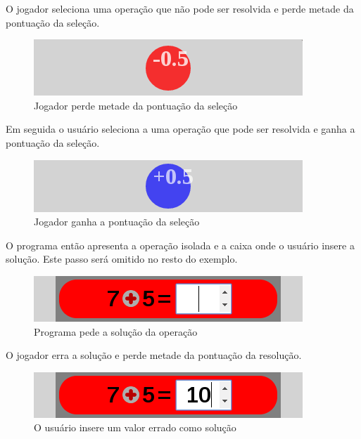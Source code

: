O jogador seleciona uma operação que não pode ser resolvida e perde metade da pontuação da seleção.

\begin{figure}[H]
	\caption{\label{miss_0_5_1}Jogador perde metade da pontuação da seleção}
	\begin{center}
	    \includegraphics[scale=1]{miss_0_5.png}
	\end{center}
\end{figure}

Em seguida o usuário seleciona a uma operação que pode ser resolvida e ganha a pontuação da seleção.

\begin{figure}[H]
	\caption{\label{score_0_5_1}Jogador ganha a pontuação da seleção}
	\begin{center}
	    \includegraphics[scale=1]{score_0_5.png}
	\end{center}
\end{figure}

O programa então apresenta a operação isolada e a caixa onde o usuário insere a solução. Este passo será omitido no resto do exemplo.

\begin{figure}[H]
	\caption{\label{xp_2}Programa pede a solução da operação}
	\begin{center}
	    \includegraphics[scale=1]{xp_4_2_asksol_1.png}
	\end{center}
\end{figure}

O jogador erra a solução e perde metade da pontuação da resolução.

\begin{figure}[H]
	\caption{\label{xp_3}O usuário insere um valor errado como solução}
	\begin{center}
	    \includegraphics[scale=1]{xp_4_3_wrongans_1.png}
	\end{center}
\end{figure}

